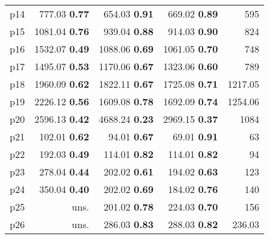 \begin{tabular}{lrrrr}
\multicolumn{1}{l|}{p14} & {\footnotesize 777.03} \textbf{0.77} & {\footnotesize 654.03} \textbf{0.91} & {\footnotesize 669.02} \textbf{0.89} & \multicolumn{1}{|r}{595}\\
\multicolumn{1}{l|}{p15} & {\footnotesize 1081.04} \textbf{0.76} & {\footnotesize 939.04} \textbf{0.88} & {\footnotesize 914.03} \textbf{0.90} & \multicolumn{1}{|r}{824}\\
\multicolumn{1}{l|}{p16} & {\footnotesize 1532.07} \textbf{0.49} & {\footnotesize 1088.06} \textbf{0.69} & {\footnotesize 1061.05} \textbf{0.70} & \multicolumn{1}{|r}{748}\\
\multicolumn{1}{l|}{p17} & {\footnotesize 1495.07} \textbf{0.53} & {\footnotesize 1170.06} \textbf{0.67} & {\footnotesize 1323.06} \textbf{0.60} & \multicolumn{1}{|r}{789}\\
\multicolumn{1}{l|}{p18} & {\footnotesize 1960.09} \textbf{0.62} & {\footnotesize 1822.11} \textbf{0.67} & {\footnotesize 1725.08} \textbf{0.71} & \multicolumn{1}{|r}{1217.05}\\
\multicolumn{1}{l|}{p19} & {\footnotesize 2226.12} \textbf{0.56} & {\footnotesize 1609.08} \textbf{0.78} & {\footnotesize 1692.09} \textbf{0.74} & \multicolumn{1}{|r}{1254.06}\\
\multicolumn{1}{l|}{p20} & {\footnotesize 2596.13} \textbf{0.42} & {\footnotesize 4688.24} \textbf{0.23} & {\footnotesize 2969.15} \textbf{0.37} & \multicolumn{1}{|r}{1084}\\
\multicolumn{1}{l|}{p21} & {\footnotesize 102.01} \textbf{0.62} & {\footnotesize 94.01} \textbf{0.67} & {\footnotesize 69.01} \textbf{0.91} & \multicolumn{1}{|r}{63}\\
\multicolumn{1}{l|}{p22} & {\footnotesize 192.03} \textbf{0.49} & {\footnotesize 114.01} \textbf{0.82} & {\footnotesize 114.01} \textbf{0.82} & \multicolumn{1}{|r}{94}\\
\multicolumn{1}{l|}{p23} & {\footnotesize 278.04} \textbf{0.44} & {\footnotesize 202.02} \textbf{0.61} & {\footnotesize 194.02} \textbf{0.63} & \multicolumn{1}{|r}{123}\\
\multicolumn{1}{l|}{p24} & {\footnotesize 350.04} \textbf{0.40} & {\footnotesize 202.02} \textbf{0.69} & {\footnotesize 184.02} \textbf{0.76} & \multicolumn{1}{|r}{140}\\
\multicolumn{1}{l|}{p25} & uns. & {\footnotesize 201.02} \textbf{0.78} & {\footnotesize 224.03} \textbf{0.70} & \multicolumn{1}{|r}{156}\\
\multicolumn{1}{l|}{p26} & uns. & {\footnotesize 286.03} \textbf{0.83} & {\footnotesize 288.03} \textbf{0.82} & \multicolumn{1}{|r}{236.03}\\

\end{tabular}
